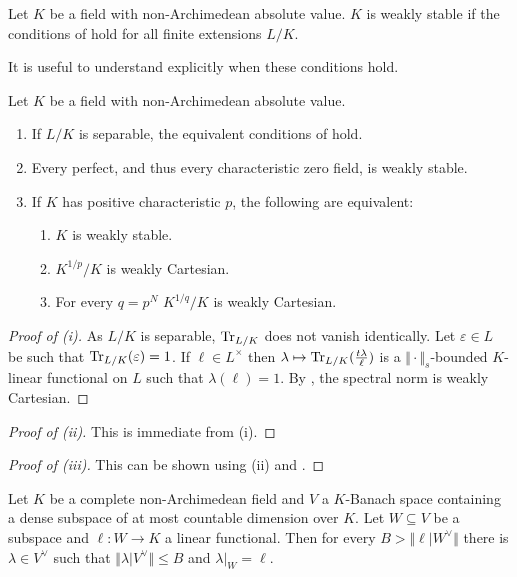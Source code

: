 \begin{definition}
    Let $K$ be a field with non-Archimedean absolute value. $K$ is weakly stable if the conditions of  hold for all finite extensions $L/K$. 
\end{definition}
It is useful to understand explicitly when these conditions hold. 
\begin{proposition}\label{prop: when things are weakly stable}
    Let $K$ be a field with non-Archimedean absolute value. 
    \begin{enumerate}[label=(\roman*)]
        \item If $L/K$ is separable, the equivalent conditions of  hold. 
        \item Every perfect, and thus every characteristic zero field, is weakly stable. 
        \item If $K$ has positive characteristic $p$, the following are equivalent: 
        \begin{enumerate}[label=(\alph*)]
            \item $K$ is weakly stable. 
            \item $K^{1/p}/K$ is weakly Cartesian. 
            \item For every $q=p^{N}$ $K^{1/q}/K$ is weakly Cartesian. 
        \end{enumerate}
    \end{enumerate}
\end{proposition}
\begin{proof}[Proof of (i)]
    As $L/K$ is separable, $\mathrm{Tr}_{L/K}$ does not vanish identically. Let $\varepsilon\in L$ be such that $\mathrm{Tr}_{L/K}(\varepsilon)=1$. If $\ell\in L^{\times}$ then $\lambda\mapsto\mathrm{Tr}_{L/K}(\frac{t\lambda}{\ell})$ is a $\Vert\cdot\Vert_{s}$-bounded $K$-linear functional on $L$ such that $\lambda(\ell)=1$. By , the spectral norm is weakly Cartesian. 
\end{proof}
\begin{proof}[Proof of (ii)]
    This is immediate from (i). 
\end{proof}
\begin{proof}[Proof of (iii)]
    This can be shown using (ii) and . 
\end{proof}
\begin{proposition}\label{prop: restriction of bounded functionals}
    Let $K$ be a complete non-Archimedean field and $V$ a $K$-Banach space containing a dense subspace of at most countable dimension over $K$. Let $W\subseteq V$ be a subspace and $\ell:W\to K$ a linear functional. Then for every $B>\Vert \ell|W^{\vee}\Vert$ there is $\lambda\in V^{\vee}$ such that $\Vert\lambda|V^{\vee}\Vert\leq B$ and $\lambda|_{W}=\ell$. 
\end{proposition}
